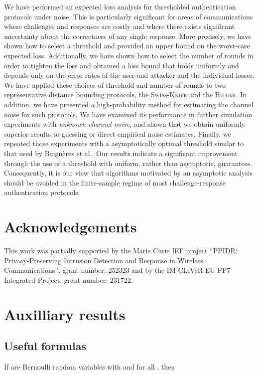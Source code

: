 \documentclass[a4paper]{article}
\newcommand \techreport[1]{#1}
\newcommand \Swiss {\textsc{Swiss-Knife}}
\newcommand \Hitomi {\textsc{Hitomi}}
\theoremstyle{plain} \newtheorem{remark}{Remark}
\theoremstyle{plain} \newtheorem{definition}{Definition}
\theoremstyle{plain} \newtheorem{example}{Example}
\theoremstyle{plain} \newtheorem{assumption}{Assumption}
\theoremstyle{plain} \newtheorem{conjecture}{Conjecture}
\theoremstyle{plain} \newtheorem{theorem}{Theorem}
\theoremstyle{plain} \newtheorem{proposition}{Proposition}
\theoremstyle{plain} \newtheorem{lemma}{Lemma}
\theoremstyle{plain} \newtheorem{corollary}{Corollary}
\begin{document}
We have performed an expected loss analysis for thresholded
authentication protocols under noise.  This is particularly
significant for areas of communications where challenges and responses
are costly and where there exists significant uncertainty about the
correctness of any single response. More precisely, we have shown how
to select a threshold and provided an upper bound on the worst-case
expected loss. Additionally, we have shown how to select the number of
rounds in order to tighten the loss and obtained a loss bound that
holds uniformly and depends only on the error rates of the user and
attacker and the individual losses.  We have applied these choices of
threshold and number of rounds to two representative distance bounding
protocols, the {\Swiss} and the \Hitomi. In addition, we have
presented a high-probability method for estimating the channel noise
for such protocols.  We have examined its performance in further
simulation experiments with {\em unknown channel noise}, and shown
that we obtain uniformly superior results to guessing or direct
empirical noise estimates. Finally, we repeated those experiments with
a asymptotically optimal threshold similar to that used by
Baign\`{e}res et al.\cite{ProvSec2010}. Our results indicate a
significant improvement through the use of a threshold with uniform,
rather than asymptotic, guarantees. Consequently, it is our view that
algorithms motivated by an asymptotic analysis should be avoided in
the finite-sample regime of most challenge-response authentication
protocols.







\section*{Acknowledgements}
This work was partially supported by the Marie Curie IEF project
``PPIDR: Privacy-Preserving Intrusion Detection and Response in
Wireless Communications'', grant number: 252323 and by the IM-CLeVeR
EU FP7 Integrated Project, grant number: 231722.

\appendix
\techreport{\section{Auxilliary results}}
\subsection{Useful formulas}
\label{sec:binomial}
If  are Bernoulli random variables with  and  for all , then
\end{document}
